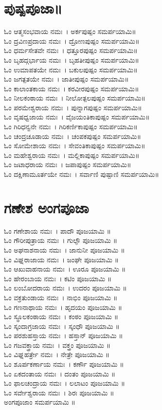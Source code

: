 \section{ಪುಷ್ಪಪೂಜಾ॥}
ಓಂ ಆತ್ಮಸಂಭವಾಯ ನಮಃ~। ಅರ್ಕಪುಷ್ಪಂ ಸಮರ್ಪಯಾಮಿ॥\\
ಓಂ ದ್ರವಿಣಪ್ರದಾಯ ನಮಃ~। ದ್ರೋಣಪುಷ್ಪಂ ಸಮರ್ಪಯಾಮಿ॥\\
ಓಂ ಧರ್ಮಸೇತವೇ ನಮಃ~। ಧತ್ತೂರಪುಷ್ಪಂ ಸಮರ್ಪಯಾಮಿ॥\\
ಓಂ ಬೃಹದ್ಗರ್ಭಾಯ ನಮಃ~। ಬೃಹತೀಪುಷ್ಪಂ ಸಮರ್ಪಯಾಮಿ॥\\
ಓಂ ಉಮಾಪತಯೇ ನಮಃ~। ಬಕುಲಪುಷ್ಪಂ ಸಮರ್ಪಯಾಮಿ॥\\
ಓಂ ಜಗತ್ಪತಯೇ ನಮಃ~। ಜಾತೀಪುಷ್ಪಂ ಸಮರ್ಪಯಾಮಿ॥\\
ಓಂ ಕಾಲಾಂತಕಾಯ ನಮಃ~। ಕರವೀರಪುಷ್ಪಂ ಸಮರ್ಪಯಾಮಿ॥\\
ಓಂ ನೀಲಕಂಠಾಯ ನಮಃ~। ನೀಲೋತ್ಪಲಪುಷ್ಪಂ ಸಮರ್ಪಯಾಮಿ॥\\
ಓಂ ಪರಮೇಶ್ವರಾಯ ನಮಃ~। ಪುನ್ನಾಗಪುಷ್ಪಂ ಸಮರ್ಪಯಾಮಿ॥\\
ಓಂ ವೃಷಧ್ವಜಾಯ ನಮಃ~। ವೈಜಯಂತಿಕಾಪುಷ್ಪಂ ಸಮರ್ಪಯಾಮಿ॥\\
ಓಂ ಗಿರಿಧನ್ವನೇ ನಮಃ~। ಗಿರಿಕರ್ಣಿಕಾಪುಷ್ಪಂ ಸಮರ್ಪಯಾಮಿ॥\\
ಓಂ ಚಂದ್ರಚೂಡಾಯ ನಮಃ~। ಚಂಪಕಪುಷ್ಪಂ ಸಮರ್ಪಯಾಮಿ॥\\
ಓಂ ಸೋಮೇಶಾಯ ನಮಃ~। ಸೇವಂತಿಕಾಪುಷ್ಪಂ ಸಮರ್ಪಯಾಮಿ॥\\
ಓಂ ಮಹೇಶ್ವರಾಯ ನಮಃ~। ಮಲ್ಲಿಕಾಪುಷ್ಪಂ ಸಮರ್ಪಯಾಮಿ॥\\
ಓಂ ಜಟಾಧರಾಯ ನಮಃ~। ಜಪಾಪುಷ್ಪಂ ಸಮರ್ಪಯಾಮಿ॥\\
ಓಂ ದಕ್ಷಿಣಾಮೂರ್ತಯೇ ನಮಃ~। ಸರ್ವಾಣಿ ಪುಷ್ಪಾಣಿ ಸಮರ್ಪಯಾಮಿ॥
\section{ಗಣೇಶ ಅಂಗಪೂಜಾ }
ಓಂ ಗಣೇಶಾಯ ನಮಃ~। ಪಾದೌ ಪೂಜಯಾಮಿ ॥\\
ಓಂ ಗೌರೀಪುತ್ರಾಯ ನಮಃ~। ಗುಲ್ಫೌ ಪೂಜಯಾಮಿ ॥\\
ಓಂ ಅಘನಾಶನಾಯ ನಮಃ~। ಜಾನುನೀ ಪೂಜಯಾಮಿ ॥\\
ಓಂ ವಿಘ್ನರಾಜಾಯ ನಮಃ~। ಜಂಘೇ ಪೂಜಯಾಮಿ ॥\\
ಓಂ ಆಖುವಾಹನಾಯ ನಮಃ~। ಊರೂ ಪೂಜಯಾಮಿ ॥\\
ಓಂ ಹೇರಂಬಾಯ ನಮಃ~। ಕಟಿಂ ಪೂಜಯಾಮಿ ॥\\
ಓಂ ಲಂಬೋದರಾಯ ನಮಃ~। ಉದರಂ ಪೂಜಯಾಮಿ ॥\\
ಓಂ ವಕ್ರತುಂಡಾಯ ನಮಃ~। ನಾಭಿಂ ಪೂಜಯಾಮಿ ॥\\
ಓಂ ಗಣನಾಥಾಯ ನಮಃ~। ಹೃದಯಂ ಪೂಜಯಾಮಿ ॥\\
ಓಂ ಸ್ಥೂಲಕಂಠಾಯ ನಮಃ~। ಕಂಠಂ ಪೂಜಯಾಮಿ ॥\\
ಓಂ ಸ್ಕಂದಾಗ್ರಜಾಯ ನಮಃ~। ಸ್ಕಂಧೌ ಪೂಜಯಾಮಿ ॥\\
ಓಂ ಪರಶುಹಸ್ತಾಯ ನಮಃ~। ಹಸ್ತಾನ್ ಪೂಜಯಾಮಿ ॥\\
ಓಂ ಗಜವಕ್ತ್ರಾಯ ನಮಃ~। ವಕ್ತ್ರಂ ಪೂಜಯಾಮಿ ॥\\
ಓಂ ವಿಘ್ನಹರ್ತ್ರೇ ನಮಃ~। ನೇತ್ರೇ ಪೂಜಯಾಮಿ ॥\\
ಓಂ ಶೂರ್ಪಕರ್ಣಾಯ ನಮಃ~। ಕರ್ಣೌ ಪೂಜಯಾಮಿ ॥\\
ಓಂ ಏಕದಂತಾಯ ನಮಃ~। ದಂತಂ ಪೂಜಯಾಮಿ ॥\\
ಓಂ ಫಾಲಚಂದ್ರಾಯ ನಮಃ~। ಲಲಾಟಂ ಪೂಜಯಾಮಿ ॥\\
ಓಂ ಸರ್ವೇಶ್ವರಾಯ ನಮಃ~। ಶಿರಃ ಪೂಜಯಾಮಿ ॥\\
ಅಂಗಪೂಜಾಂ ಸಮರ್ಪಯಾಮಿ ॥
